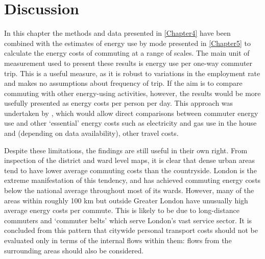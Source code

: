 % 


% 
% 

\section{Discussion}
In this chapter the methods and data presented in
\cref{Chapter4} have been combined with the estimates of energy use by mode presented in
\cref{Chapter5} to calculate the energy costs of commuting at a range of scales.
The main unit of measurement used to present these results is
energy use per one-way commuter trip. This is a useful measure, as it is
robust to variations in the employment rate and makes no assumptions about
frequency of trip. If the aim is to compare commuting with other energy-using
activities, however, the results would be more usefully presented as energy
costs per person per day. This approach was undertaken
by \citet{Boussauw2009}, which would allow
direct comparisons between commuter energy use and other `essential'
energy costs such as electricity and gas use in the house and (depending on
data availability), other travel costs. %

Despite these limitations, the findings are still useful in their own right.
From inspection of the district and ward level maps, it is clear that dense
urban areas tend to have lower average commuting costs than the countryside.
London is the extreme manifestation of this tendency, and has achieved
commuting energy costs below the national average throughout most of its
wards. However, many of the areas within roughly 100 km but outside
Greater London have unusually high  average energy costs per commute.
This is likely to be due to long-distance commuters and `commuter belts'
which serve London's vast service sector. It is concluded from this
pattern that citywide personal transport costs should not be evaluated
only in terms of the internal flows within them: flows from the surrounding
areas should also be considered.

